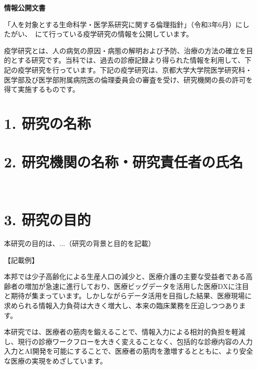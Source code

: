 \documentclass[a4paper,11pt,lualatex,ja=standard]{bxjsarticle}
\begin{document}
\begin{center}
{\LARGE \textbf{情報公開文書}}
\end{center}

\vspace{2em}

\noindent
「人を対象とする生命科学・医学系研究に関する倫理指針」（令和3年6月）にしたがい、\InstitutionName\ \DepartmentName にて行っている疫学研究の情報を公開しています。

\vspace{1em}

\noindent
疫学研究とは、人の病気の原因・病態の解明および予防、治療の方法の確立を目的とする研究です。当科では、過去の診療記録より得られた情報を利用して、下記の疫学研究を行っています。下記の疫学研究は、京都大学大学院医学研究科・医学部及び医学部附属病院医の倫理委員会の審査を受け、研究機関の長の許可を得て実施するものです。

\vspace{2em}

\section*{1. 研究の名称}

\ResearchTitle

\section*{2. 研究機関の名称・研究責任者の氏名}

\InstitutionName\ \DepartmentName\ %

\section*{3. 研究の目的}

本研究の目的は、...（研究の背景と目的を記載）

\vspace{1em}

\noindent
【記載例】

\noindent
本邦では少子高齢化による生産人口の減少と、医療介護の主要な受益者である高齢者の増加が急速に進行しており、医療ビッグデータを活用した医療DXに注目と期待が集まっています。しかしながらデータ活用を目指した結果、医療現場に求められる情報入力負荷は大きく増大し、本来の臨床業務を圧迫しつつあります。

\noindent
本研究では、医療者の筋肉を鍛えることで、情報入力による相対的負担を軽減し、現行の診療ワークフローを大きく変えることなく、包括的な診療内容の人力入力とAI開発を可能にすることで、医療者の筋肉を激増するとともに、より安全な医療の実現をめざしています。
\end{document}
